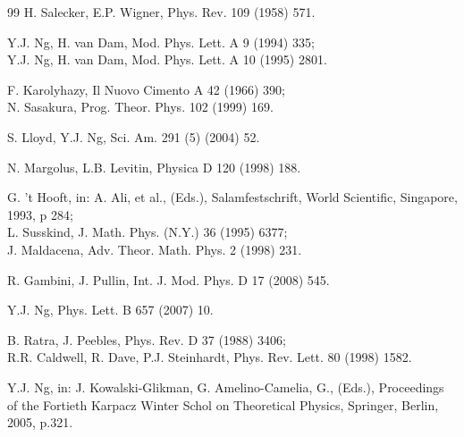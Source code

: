 \documentclass[12pt]{article}
\begin{document}
\begin{thebibliography}{99}
H. Salecker, E.P. Wigner,  
Phys. Rev. 109 (1958) 571.

Y.J. Ng, H. van Dam,  
Mod. Phys. Lett. A 9 (1994) 335;\\
Y.J. Ng, H. van Dam, 
Mod. Phys. Lett. A 10 (1995) 2801.

F. Karolyhazy,  
Il Nuovo Cimento A 42 (1966) 390;\\
N. Sasakura, 
Prog. Theor. Phys. 102 (1999) 169.


S. Lloyd, Y.J. Ng, 
Sci. Am. 291 (5) (2004) 52.


N. Margolus, L.B. Levitin, 
Physica D 120 (1998) 188.

G. 't Hooft, in: A. Ali, et al., (Eds.), Salamfestschrift,
World Scientific, Singapore, 1993, p 284;\\
L. Susskind,  
J. Math. Phys. (N.Y.) 36 (1995) 6377;\\
J. Maldacena, 
Adv. Theor. Math. Phys. 2 (1998) 231.

R. Gambini, J. Pullin, 
Int. J. Mod. Phys. D 17 (2008) 545.

Y.J. Ng, 
Phys. Lett. B 657 (2007) 10.


B. Ratra, J. Peebles, Phys. Rev. D 37 (1988) 3406;\\
R.R. Caldwell, R. Dave, P.J. Steinhardt, Phys. Rev. Lett. 80 (1998) 1582.

Y.J. Ng, in: 
J. Kowalski-Glikman, G. Amelino-Camelia, G., (Eds.),
Proceedings of the Fortieth Karpacz Winter Schol on
Theoretical Physics, 
Springer, Berlin, 2005, p.321.



\end{thebibliography}
\end{document}
